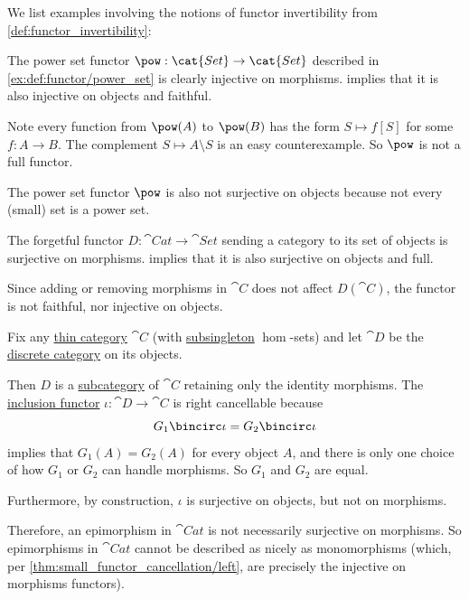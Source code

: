 \begin{example}\label{ex:def:functor_invertibility}
  We list examples involving the notions of functor invertibility from \cref{def:functor_invertibility}:

  \begin{thmenum}
     The power set functor \( \pow: \cat{Set} \to \cat{Set} \) described in \cref{ex:def:functor/power_set} is clearly injective on morphisms.  implies that it is also injective on objects and faithful.

    Note every function from \( \pow(A) \) to \( \pow(B) \) has the form \( S \mapsto f[S] \) for some \( f: A \to B \). The complement \( S \mapsto A \setminus S \) is an easy counterexample. So \( \pow \) is not a full functor.

    The power set functor \( \pow \) is also not surjective on objects because not every (small) set is a power set.

     The forgetful functor \( D: \cat{Cat} \to \cat{Set} \) sending a category to its set of objects is surjective on morphisms.  implies that it is also surjective on objects and full.

    Since adding or removing morphisms in \( \cat{C} \) does not affect \( D(\cat{C}) \), the functor is not faithful, nor injective on objects.

     Fix any \hyperref[def:thin_category]{thin category} \( \cat{C} \) (with \hyperref[def:subsingleton_set]{subsingleton} \( \hom \)-sets) and let \( \cat{D} \) be the \hyperref[def:discrete_category]{discrete category} on its objects.

    Then \( D \) is a \hyperref[def:subcategory]{subcategory} of \( \cat{C} \) retaining only the identity morphisms. The \hyperref[def:subcategory/inclusion]{inclusion functor} \( \iota: \cat{D} \to \cat{C} \) is right cancellable because
    \begin{equation*}
      G_1 \bincirc \iota = G_2 \bincirc \iota
    \end{equation*}
    implies that \( G_1(A) = G_2(A) \) for every object \( A \), and there is only one choice of how \( G_1 \) or \( G_2 \) can handle morphisms. So \( G_1 \) and \( G_2 \) are equal.

    Furthermore, by construction, \( \iota \) is surjective on objects, but not on morphisms.

    Therefore, an epimorphism in \( \cat{Cat} \) is not necessarily surjective on morphisms. So epimorphisms in \( \cat{Cat} \) cannot be described as nicely as monomorphisms (which, per \cref{thm:small_functor_cancellation/left}, are precisely the injective on morphisms functors).
  \end{thmenum}
\end{example}

